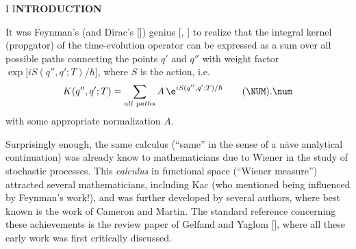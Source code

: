 \def\Kapitel{}
\def\Chapter{Contents}
\def\rightheadline{\eightpoint\hfil\eightrm Contents\hfil}
\contents
{}

\vfill\eject
\baselineskip=11pt
\def\Kapitel{I}
\def\Chapter{Introduction}
\def\Section{Introduction}
\def\rightheadline{\eightpoint\eightrm\Kapitel\hfil\Section}
\centerline{\fourteenbf I I\bf NTRODUCTION}

\bigskip\noindent
It was Feynman's (and Dirac's [\DIRd]) genius [\FEYa, \FEYb] to realize
that the integral kernel (propgator) of the time-evolution operator can
be expressed as a sum over all possible paths connecting the points $q'$
and $q''$ with weight factor $\exp\big[iS(q'',q';T)/\hbar\big]$,
where $S$ is the action, i.e.
\plus
$$K(q'',q';T)=\sum_{all\ paths} A\,\e^{iS(q'',q';T)/\hbar}
  \tag\NUM.\num$$\plus%
with some appropriate normalization $A$.

Surprisingly enough, the same calculus (``same'' in the  sense of a
na\"\ii ve analytical continuation) was already  know to mathematicians
due to Wiener in the study of stochastic processes. This {\it calculus}
in functional space (``Wiener measure'') attracted several
mathematicians, including Kac (who mentioned being influenced by
Feynman's work!), and was further developed by several authors, where
best known is the work of Cameron and Martin. The standard reference
concerning these achievements is the review paper of Gelfand and Yaglom
[\GY], where all these early work was first critically discussed.

